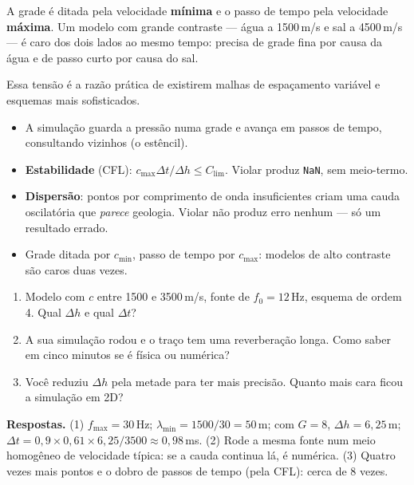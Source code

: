 \documentclass[11pt,a4paper,oneside]{report}
\begin{document}
\begin{atencao}
A grade \'e ditada pela velocidade \textbf{m\'inima} e o passo de tempo pela
velocidade \textbf{m\'axima}. Um modelo com grande contraste --- \'agua a
1500\,m/s e sal a 4500\,m/s --- \'e caro dos dois lados ao mesmo tempo:
precisa de grade fina por causa da \'agua e de passo curto por causa do sal.

Essa tens\~ao \'e a raz\~ao pr\'atica de existirem malhas de espa\c{c}amento
vari\'avel e esquemas mais sofisticados.
\end{atencao}

\begin{resumo}
\begin{itemize}[leftmargin=*, itemsep=1pt]
\item A simula\c{c}\~ao guarda a press\~ao numa grade e avan\c{c}a em passos
de tempo, consultando vizinhos (o est\^encil).
\item \textbf{Estabilidade} (CFL): $c_{\max}\Delta t/\Delta h \le C_{\lim}$.
Violar produz \texttt{NaN}, sem meio-termo.
\item \textbf{Dispers\~ao}: pontos por comprimento de onda insuficientes
criam uma cauda oscilat\'oria que \emph{parece} geologia. Violar n\~ao produz
erro nenhum --- s\'o um resultado errado.
\item Grade ditada por $c_{\min}$, passo de tempo por $c_{\max}$: modelos de
alto contraste s\~ao caros duas vezes.
\end{itemize}
\end{resumo}

\begin{exercicio}
\begin{enumerate}[leftmargin=*, itemsep=2pt]
\item Modelo com $c$ entre 1500 e 3500\,m/s, fonte de $f_0 = 12$\,Hz, esquema
de ordem 4. Qual $\Delta h$ e qual $\Delta t$?
\item A sua simula\c{c}\~ao rodou e o tra\c{c}o tem uma reverbera\c{c}\~ao
longa. Como saber em cinco minutos se \'e f\'isica ou num\'erica?
\item Voc\^e reduziu $\Delta h$ pela metade para ter mais precis\~ao. Quanto
mais cara ficou a simula\c{c}\~ao em 2D?
\end{enumerate}
\textbf{Respostas.} (1) $f_{\max} = 30$\,Hz; $\lambda_{\min} = 1500/30 =
50$\,m; com $G=8$, $\Delta h = 6{,}25$\,m; $\Delta t = 0{,}9 \times 0{,}61
\times 6{,}25/3500 \approx 0{,}98$\,ms. (2) Rode a mesma fonte num meio
homog\^eneo de velocidade t\'ipica: se a cauda continua l\'a, \'e num\'erica.
(3) Quatro vezes mais pontos e o dobro de passos de tempo (pela CFL): cerca de
8 vezes.
\end{exercicio}
\end{document}
